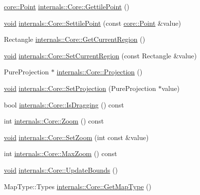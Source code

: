 \begin{DoxyCompactItemize}
\item 
\hyperlink{structcore_1_1_point}{core\-::\-Point} \hyperlink{group___o_p_map_widget_ga917de66816feaf3dfde7727bbb8ed6e2}{internals\-::\-Core\-::\-Gettile\-Point} ()
\item 
\hyperlink{group___u_a_v_objects_plugin_ga444cf2ff3f0ecbe028adce838d373f5c}{void} \hyperlink{group___o_p_map_widget_ga9d04a0fb020c49a8280b7368f41594a2}{internals\-::\-Core\-::\-Settile\-Point} (const \hyperlink{structcore_1_1_point}{core\-::\-Point} \&value)
\item 
\-Rectangle \hyperlink{group___o_p_map_widget_ga00bfe5203c4a1a950f4699bf6fe59293}{internals\-::\-Core\-::\-Get\-Current\-Region} ()
\item 
\hyperlink{group___u_a_v_objects_plugin_ga444cf2ff3f0ecbe028adce838d373f5c}{void} \hyperlink{group___o_p_map_widget_gaddaa2d4fdadeb35b3d6e5c36414ad438}{internals\-::\-Core\-::\-Set\-Current\-Region} (const \-Rectangle \&value)
\item 
\-Pure\-Projection $\ast$ \hyperlink{group___o_p_map_widget_ga9c5fee7624bff404ca2529858e9a444a}{internals\-::\-Core\-::\-Projection} ()
\item 
\hyperlink{group___u_a_v_objects_plugin_ga444cf2ff3f0ecbe028adce838d373f5c}{void} \hyperlink{group___o_p_map_widget_gae73f665340d21d819b8309c1d39d44bb}{internals\-::\-Core\-::\-Set\-Projection} (\-Pure\-Projection $\ast$value)
\item 
bool \hyperlink{group___o_p_map_widget_gad8a3ada83240ab83169d589af8486058}{internals\-::\-Core\-::\-Is\-Dragging} () const 
\item 
int \hyperlink{group___o_p_map_widget_ga5cf2de6f702a137c1c43767aad11b160}{internals\-::\-Core\-::\-Zoom} () const 
\item 
\hyperlink{group___u_a_v_objects_plugin_ga444cf2ff3f0ecbe028adce838d373f5c}{void} \hyperlink{group___o_p_map_widget_ga5cdc1bd7abb72b74bb3cf85d3aec9e3d}{internals\-::\-Core\-::\-Set\-Zoom} (int const \&value)
\item 
int \hyperlink{group___o_p_map_widget_ga50e3825136212baafad997c35bf606ef}{internals\-::\-Core\-::\-Max\-Zoom} () const 
\item 
\hyperlink{group___u_a_v_objects_plugin_ga444cf2ff3f0ecbe028adce838d373f5c}{void} \hyperlink{group___o_p_map_widget_gacbeb6f00e71443854ec421841d9bc431}{internals\-::\-Core\-::\-Update\-Bounds} ()
\item 
\-Map\-Type\-::\-Types \hyperlink{group___o_p_map_widget_gad38d6a52a014cb9b52c6df7d47f3e3fe}{internals\-::\-Core\-::\-Get\-Map\-Type} ()

\end{DoxyCompactItemize}
